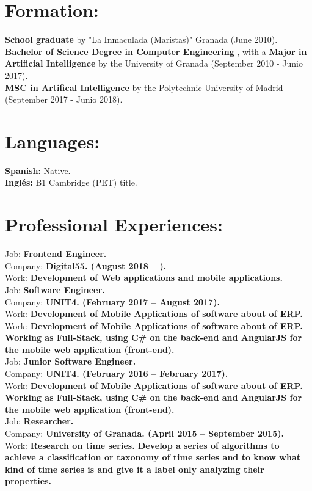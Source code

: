 \documentclass	[10pt,a4paper,oneside]{article}
\newcommand{\seccion}[1]{\vspace*{3mm}\section*{#1}\vspace*{-3mm}}
\begin{document}
\seccion{Formation:}
\textbf{School graduate} by "La Inmaculada (Maristas)" Granada (June 2010).\\
\textbf{Bachelor of Science Degree in Computer Engineering} , with a \textbf{Major in Artificial Intelligence} by the University of Granada (September 2010 - Junio 2017).\\
\textbf{MSC in Artifical Intelligence} by the Polytechnic University of Madrid (September 2017 - Junio 2018).\\

\seccion{Languages:}
\textbf{Spanish:} Native.\\
\textbf{Inglés:} B1 Cambridge (PET) title.\\


\seccion{Professional Experiences:}

Job: \textbf{Frontend Engineer.}\\
Company: \textbf{Digital55. (August 2018 – ).}\\
Work: \textbf{Development of Web applications and mobile applications.}\\

Job: \textbf{Software Engineer.}\\
Company: \textbf{UNIT4. (February 2017 – August 2017).}\\
Work: \textbf{Development of Mobile Applications of software about of ERP.}\\
Work: \textbf{Development of Mobile Applications of software about of ERP. Working as Full-Stack, using C\# on the back-end and AngularJS for the mobile web application (front-end).}\\

Job: \textbf{Junior Software Engineer.}\\
Company: \textbf{UNIT4. (February 2016 – February 2017).}\\
Work: \textbf{Development of Mobile Applications of software about of ERP. Working as Full-Stack, using C\# on the back-end and AngularJS for the mobile web application (front-end).}\\

Job: \textbf{Researcher.}\\
Company: \textbf{University of Granada. (April 2015 – September 2015).}\\
Work: \textbf{Research on time series. Develop a series of algorithms to achieve a classification or taxonomy of time series and to know what kind of time series is and give it a label only analyzing their properties.}\\
\end{document}
